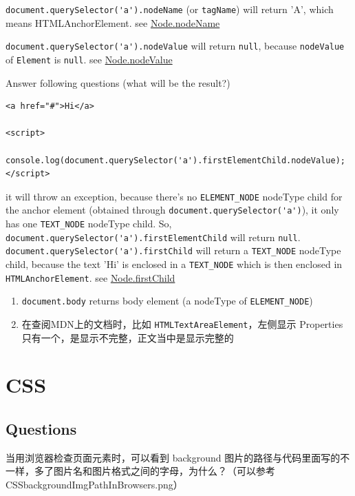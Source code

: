 \documentclass[a4paper, 12pt]{article}
\begin{document}
{\color{red}\verb|document.querySelector('a').nodeName| (or \verb|tagName|)} will return 'A', which means HTMLAnchorElement. see \href{https://developer.mozilla.org/en-US/docs/Web/API/Node/nodeName}{Node.nodeName}

\verb|document.querySelector('a').nodeValue| will return \verb|null|, because \verb|nodeValue| of \verb|Element| is \verb|null|. see \href{https://developer.mozilla.org/en-US/docs/Web/API/Node/nodeValue}{Node.nodeValue}

Answer following questions (what will be the result?)
\begin{verbatim}
<a href="#">Hi</a>

<script>
  console.log(document.querySelector('a').firstElementChild.nodeValue);
</script>
\end{verbatim}

it will throw an exception, because there's no \verb|ELEMENT_NODE| nodeType child for the anchor element (obtained through \verb|document.querySelector('a')|), it only has one \verb|TEXT_NODE| nodeType child. So, \verb|document.querySelector('a').firstElementChild| will return \verb|null|. \verb|document.querySelector('a').firstChild| will return a \verb|TEXT_NODE| nodeType child, because the text 'Hi' is enclosed in a \verb|TEXT_NODE| which is then enclosed in \verb|HTMLAnchorElement|. see \href{https://developer.mozilla.org/en-US/docs/Web/API/Node/firstChild}{Node.firstChild}

\begin{enumerate}
\item \verb|document.body| returns body element (a nodeType of \verb|ELEMENT_NODE|)

\item 在查阅MDN上的文档时，比如 \verb|HTMLTextAreaElement|，左侧显示 Properties 只有一个，是显示不完整，正文当中是显示完整的

\end{enumerate}


\section{CSS}

\subsection{Questions}
当用浏览器检查页面元素时，可以看到 background 图片的路径与代码里面写的不一样，多了图片名和图片格式之间的字母，为什么？（可以参考 CSSbackgroundImgPathInBrowsers.png）
\end{document}
